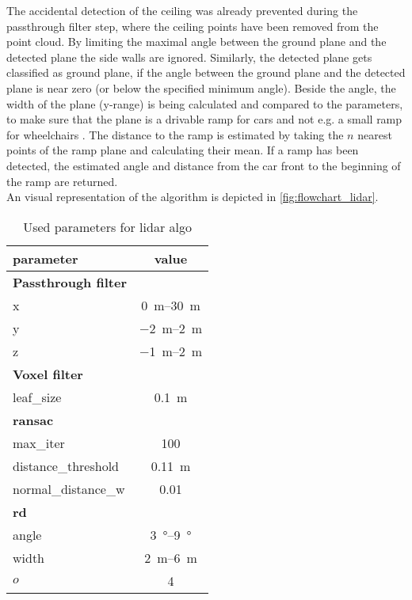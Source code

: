 The accidental detection of the ceiling was already prevented during the passthrough filter step, where the ceiling points have been removed from the point cloud.
By limiting the maximal angle between the ground plane and the detected plane the side walls are ignored.
Similarly, the detected plane gets classified as ground plane, if the angle between the ground plane and the detected plane is near zero (or below the specified minimum angle).
Beside the angle, the width of the plane (y-range) is being calculated and compared to the parameters, to make sure that the plane is a drivable ramp for cars and not e.g. a small ramp for wheelchairs .
The distance to the ramp is estimated by taking the $n$ nearest points of the ramp plane and calculating their mean.
If a ramp has been detected, the estimated angle and distance from the car front to the beginning of the ramp are returned.\\
An visual representation of the algorithm is depicted in \cref{fig:flowchart_lidar}.
\begin{table}[H]
    \centering
    \caption{Used parameters for lidar algo}
    \label{tab:lidar_params}
    \begin{tabular}[t]{lc}
        \toprule
        \textbf{parameter}  & \textbf{value}          \\
        \midrule
        \textbf{Passthrough filter}                   \\
        x                   & \SIrange{0}{30}{\metre} \\
        y                   & \SIrange{-2}{2}{\metre} \\
        z                   & \SIrange{-1}{2}{\metre} \\
        \midrule
        \textbf{Voxel filter}                         \\
        leaf\_size          & \SI{0.1}{\metre}        \\
        \midrule
        \textbf{\gls{ransac}}                         \\
        max\_iter           & 100                     \\
        distance\_threshold & \SI{0.11}{\metre}       \\
        normal\_distance\_w & 0.01                    \\
        \midrule
        \textbf{rd}                                   \\
        angle               & \SIrange{3}{9}{\degree} \\
        width               & \SIrange{2}{6}{\metre}  \\
        $o$                 & 4                       \\
        \bottomrule
    \end{tabular}
\end{table}%



